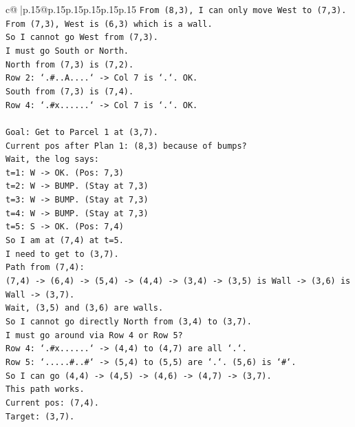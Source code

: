 \documentclass{article}
\begin{document}
{\begin{supertabular}{c@{$\;$}|p{.15\linewidth}@{}p{.15\linewidth}p{.15\linewidth}p{.15\linewidth}p{.15\linewidth}p{.15\linewidth}}
{{{\texttt{From (8,3), I can only move West to (7,3).} \\
\texttt{From (7,3), West is (6,3) which is a wall.} \\
\texttt{So I cannot go West from (7,3).} \\
\texttt{I must go South or North.} \\
\texttt{North from (7,3) is (7,2).} \\
\texttt{Row 2: `.\#..A....` {-}> Col 7 is `.`. OK.} \\
\texttt{South from (7,3) is (7,4).} \\
\texttt{Row 4: `.\#x......` {-}> Col 7 is `.`. OK.} \\
\\ 
\texttt{Goal: Get to Parcel 1 at (3,7).} \\
\texttt{Current pos after Plan 1: (8,3) because of bumps?} \\
\texttt{Wait, the log says:} \\
\texttt{t=1: W {-}> OK. (Pos: 7,3)} \\
\texttt{t=2: W {-}> BUMP. (Stay at 7,3)} \\
\texttt{t=3: W {-}> BUMP. (Stay at 7,3)} \\
\texttt{t=4: W {-}> BUMP. (Stay at 7,3)} \\
\texttt{t=5: S {-}> OK. (Pos: 7,4)} \\
\texttt{So I am at (7,4) at t=5.} \\
\texttt{I need to get to (3,7).} \\
\texttt{Path from (7,4):} \\
\texttt{(7,4) {-}> (6,4) {-}> (5,4) {-}> (4,4) {-}> (3,4) {-}> (3,5) is Wall {-}> (3,6) is Wall {-}> (3,7).} \\
\texttt{Wait, (3,5) and (3,6) are walls.} \\
\texttt{So I cannot go directly North from (3,4) to (3,7).} \\
\texttt{I must go around via Row 4 or Row 5?} \\
\texttt{Row 4: `.\#x......` {-}> (4,4) to (4,7) are all `.`.} \\
\texttt{Row 5: `.....\#..\#` {-}> (5,4) to (5,5) are `.`. (5,6) is `\#`.} \\
\texttt{So I can go (4,4) {-}> (4,5) {-}> (4,6) {-}> (4,7) {-}> (3,7).} \\
\texttt{This path works.} \\
\texttt{Current pos: (7,4).} \\
\texttt{Target: (3,7).} \\
}}}
\end{supertabular}}
\end{document}

